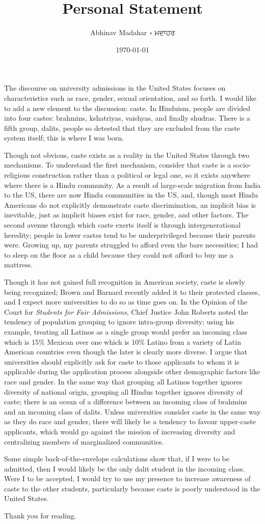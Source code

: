\documentclass{amsart}
\title{Personal Statement}
\author{Abhinav Madahar $\circ$ {\normalfont {\devanagari अभिनव} {\gurmukhi ਮਦਾਹਰ}}}
\date{\today}
\begin{document}
\maketitle

The discourse on university admissions in the United States focuses on characteristics such as race, gender, sexual orientation, and so forth.
I would like to add a new element to the discussion: caste.
In Hinduism, people are divided into four castes: brahmins, kshatriyas, vaishyas, and finally shudras.
There is a fifth group, dalits, people so detested that they are excluded from the caste system itself; this is where I was born.

Though not obvious, caste exists as a reality in the United States through two mechanisms.
To understand the first mechanism, consider that caste is a socio-religious construction rather than a political or legal one, so it exists anywhere where there is a Hindu community.
As a result of large-scale migration from India to the US, there are now Hindu communities in the US, and, though most Hindu Americans do not explicitly demonstrate caste discrimination, an implicit bias is inevitable, just as implicit biases exist for race, gender, and other factors.
The second avenue through which caste exerts itself is through intergenerational heredity; people in lower castes tend to be underprivileged because their parents were.
Growing up, my parents struggled to afford even the bare necessities; I had to sleep on the floor as a child because they could not afford to buy me a mattress.

Though it has not gained full recognition in American society, caste is slowly being recognized; Brown and Barnard recently added it to their protected classes, and I expect more universities to do so as time goes on.
In the Opinion of the Court for \textit{Students for Fair Admissions}, Chief Justice John Roberts noted the tendency of population grouping to ignore intra-group diversity; using his example, treating all Latinos as a single group would prefer an incoming class which is 15\% Mexican over one which is 10\% Latino from a variety of Latin American countries even though the later is clearly more diverse.
I argue that universities should explicitly ask for caste to those applicants to whom it is applicable during the application process alongside other demographic factors like race and gender.
In the same way that grouping all Latinos together ignores diversity of national origin, grouping all Hindus together ignores diversity of caste; there is an ocean of a difference between an incoming class of brahmins and an incoming class of dalits.
Unless universities consider caste in the same way as they do race and gender, there will likely be a tendency to favour upper-caste applicants, which would go against the mission of increasing diversity and centralizing members of marginalized communities.

Some simple back-of-the-envelope calculations show that, if I were to be admitted, then I would likely be the only dalit student in the incoming class.
Were I to be accepted, I would try to use my presence to increase awareness of caste to the other students, particularly because caste is poorly understood in the United States.

Thank you for reading.
\end{document}
